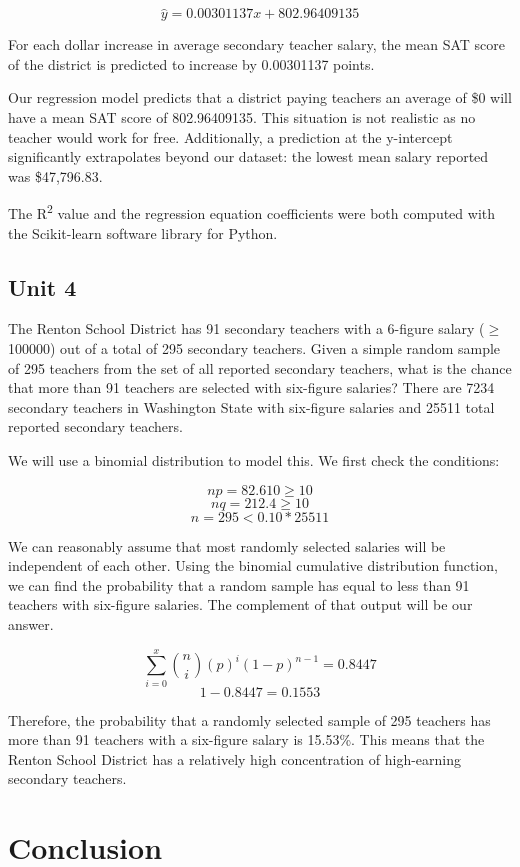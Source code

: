 \documentclass[11pt]{article} %
\begin{document}
\[\hat{y}=0.00301137x + 802.96409135\]

For each dollar increase in average secondary teacher salary, the mean SAT score of the district is predicted to increase by 0.00301137 points.

Our regression model predicts that a district paying teachers an average of \$0 will have a mean SAT score of 802.96409135. This situation is not realistic as no teacher would work for free. Additionally, a prediction at the y-intercept significantly extrapolates beyond our dataset: the lowest mean salary reported was \$47,796.83.

The R\textsuperscript{2} value and the regression equation coefficients were both computed with the Scikit-learn software library for Python.

\subsection{Unit 4}

The Renton School District has 91 secondary teachers with a 6-figure salary ($\geq$100000) out of a total of 295 secondary teachers. Given a simple random sample of 295 teachers from the set of all reported secondary teachers, what is the chance that more than 91 teachers are selected with six-figure salaries? There are 7234 secondary teachers in Washington State with six-figure salaries and 25511 total reported secondary teachers. 

We will use a binomial distribution to model this. We first check the conditions:

\[ np=82.610\geq10 \]
\[ nq=212.4\geq10 \]
\[ n=295<0.10*25511 \]

We can reasonably assume that most randomly selected salaries will be independent of each other. Using the binomial cumulative distribution function, we can find the probability that a random sample has equal to less than 91 teachers with six-figure salaries. The complement of that output will be our answer.

\[ \sum_{i=0}^{x} \binom{n}{i}(p)^i(1-p)^{n-1}=0.8447 \]
\[ 1-0.8447=0.1553 \]

Therefore, the probability that a randomly selected sample of 295 teachers has more than 91 teachers with a six-figure salary is 15.53\%. This means that the Renton School District has a relatively high concentration of high-earning secondary teachers.

\section{Conclusion}
\end{document}
